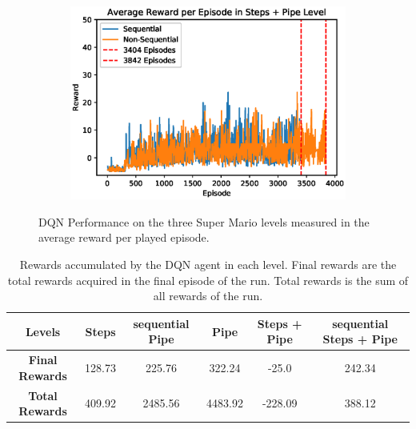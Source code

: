 \documentclass[notitlepage,a4paper,11pt]{article}
\begin{document}
\begin{figure}[t]
\begin{subfigure}[t]{0.32\textwidth}
         \includegraphics[width=\textwidth]{figs/dqn_results_3.eps}
         \caption{}
         \label{fig:dqn_results_3}
     \end{subfigure}
        \caption{DQN Performance on the three Super Mario levels measured in the average reward per played episode.}
        \label{fig:dqn_results}
\end{figure}

\begin{table}[h!]
\centering
\begin{tabular}{ |c|c|c|c|c|c| } 
	\hline
	\textbf{Levels} & Steps & sequential Pipe & Pipe & Steps + Pipe & sequential Steps + Pipe\\
	\hline
	\textbf{Final Rewards} & 128.73 & 225.76 & 322.24 & -25.0 & 242.34 \\
	\hline
	\textbf{Total Rewards} & 409.92 & 2485.56 & 4483.92 & -228.09 & 388.12 \\
	\hline
\end{tabular}
\caption{Rewards accumulated by the DQN agent in each level. Final rewards are the total rewards acquired in the final episode of the run. Total rewards is the sum of all rewards of the run.}
\end{table}
\end{document}
